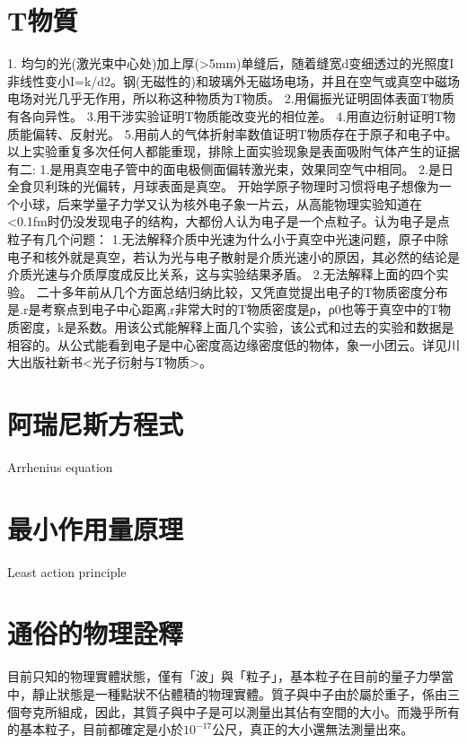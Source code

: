 \documentclass[a4paper,notitlepage,UTF8]{ctexart}
\begin{document}
\section{T物質}

  1. 均匀的光(激光束中心处)加上厚(>5mm)单缝后，随着缝宽d变细透过的光照度I非线性变小I=k/d2。钢(无磁性的)和玻璃外无磁场电场，并且在空气或真空中磁场电场对光几乎无作用，所以称这种物质为T物质。
  2.用偏振光证明固体表面T物质有各向异性。
  3.用干涉实验证明T物质能改变光的相位差。
  4.用直边衍射证明T物质能偏转、反射光。
  5.用前人的气体折射率数值证明T物质存在于原子和电子中。以上实验重复多次任何人都能重现，排除上面实验现象是表面吸附气体产生的证据有二:
1.是用真空电子管中的面电极侧面偏转激光束，效果同空气中相同。
2.是日全食贝利珠的光偏转，月球表面是真空。
  开始学原子物理时习惯将电子想像为一个小球，后来学量子力学又认为核外电子象一片云，从高能物理实验知道在<0.1fm时仍没发现电子的结构，大都份人认为电子是一个点粒子。认为电子是点粒子有几个问题：
1.无法解释介质中光速为什么小于真空中光速问题，原子中除电子和核外就是真空，若认为光与电子散射是介质光速小的原因，其必然的结论是介质光速与介质厚度成反比关系，这与实验结果矛盾。
2.无法解释上面的四个实验。
  二十多年前从几个方面总结归纳比较，又凭直觉提出电子的T物质密度分布是.r是考察点到电子中心距离,r非常大时的T物质密度是ρ，ρ0也等于真空中的T物质密度，k是系数。用该公式能解释上面几个实验，该公式和过去的实验和数据是相容的。从公式能看到电子是中心密度高边缘密度低的物体，象一小团云。详见川大出版社新书<光子衍射与T物质>。



\section{阿瑞尼斯方程式}

Arrhenius equation



\section{最小作用量原理}
Least action principle



\section{通俗的物理詮釋}

目前只知的物理實體狀態，僅有「波」與「粒子」，基本粒子在目前的量子力學當中，靜止狀態是一種點狀不佔體積的物理實體。質子與中子由於屬於重子，係由三個夸克所組成，因此，其質子與中子是可以測量出其佔有空間的大小。而幾乎所有的基本粒子，目前都確定是小於$10^{-17}$公尺，真正的大小還無法測量出來。
\end{document}
